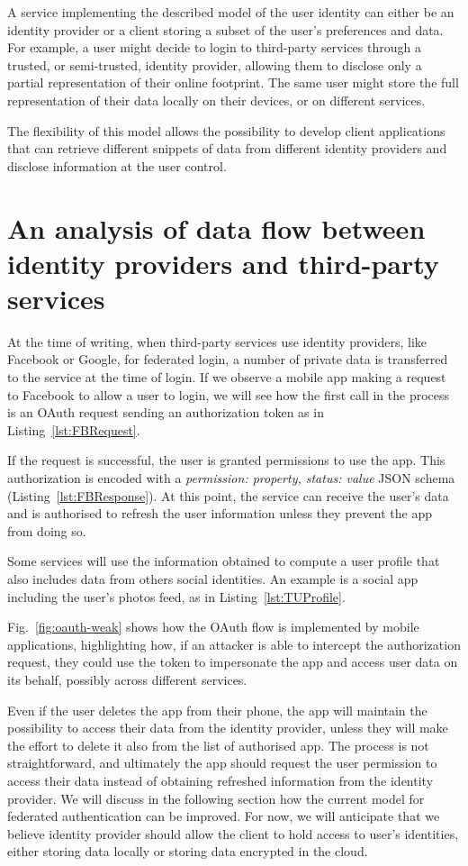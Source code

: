 A service implementing the described model of the user identity can either be an identity provider or a client storing a subset of the user's preferences and data. For example, a user might decide to login to third-party services through a trusted, or semi-trusted, identity provider, allowing them to disclose only a partial representation of their online footprint. The same user might store the full representation of their data locally on their devices, or on different services.

The flexibility of this model allows the possibility to develop client applications that can retrieve different snippets of data from different identity providers and disclose information at the user control. 

\section{An analysis of data flow between identity providers and third-party services}

At the time of writing, when third-party services use identity providers, like Facebook or Google, for federated login, a number of private data is transferred to the service at the time of login. If we observe a mobile app making a request to Facebook to allow a user to login, we will see how the first call in the process is an OAuth request sending an authorization token as in Listing~\ref{lst:FBRequest}.

If the request is successful, the user is granted permissions to use the app. This authorization is encoded with a \emph{permission: property, status: value} JSON schema (Listing~\ref{lst:FBResponse}).  At this point, the service can receive the user's data and is authorised to refresh the user information unless they prevent the app from doing so. 

Some services will use the information obtained to compute a user profile that also includes data from others social identities. An example is a social app including the user's photos feed, as in Listing~\ref{lst:TUProfile}.

Fig.~\ref{fig:oauth-weak} shows how the OAuth flow is implemented by mobile applications, highlighting how, if an attacker is able to intercept the authorization request, they could use the token to impersonate the app and access user data on its behalf, possibly across different services.

Even if the user deletes the app from their phone, the app will maintain the possibility to access their data from the identity provider, unless they will make the effort to delete it also from the list of authorised app. The process is not straightforward, and ultimately the app should request the user permission to access their data instead of obtaining refreshed information from the identity provider.
We will discuss in the following section how the current model for federated authentication can be improved. For now, we will anticipate that we believe identity provider should allow the client to hold access to user's identities, either storing data locally or storing data encrypted in the cloud.


